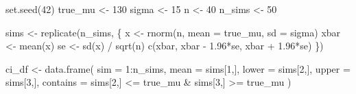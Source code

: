 \documentclass[
  12pt,
  letterpaper,
]{book}
\newenvironment{Shaded}{\begin{snugshade}}{\end{snugshade}}
\newcommand{\AttributeTok}[1]{\textcolor[rgb]{0.40,0.45,0.13}{#1}}
\newcommand{\DecValTok}[1]{\textcolor[rgb]{0.68,0.00,0.00}{#1}}
\newcommand{\FloatTok}[1]{\textcolor[rgb]{0.68,0.00,0.00}{#1}}
\newcommand{\FunctionTok}[1]{\textcolor[rgb]{0.28,0.35,0.67}{#1}}
\newcommand{\NormalTok}[1]{\textcolor[rgb]{0.00,0.23,0.31}{#1}}
\newcommand{\OtherTok}[1]{\textcolor[rgb]{0.00,0.23,0.31}{#1}}
\newcommand{\SpecialCharTok}[1]{\textcolor[rgb]{0.37,0.37,0.37}{#1}}
\begin{document}
\begin{Shaded}
\begin{Highlighting}[]
\FunctionTok{set.seed}\NormalTok{(}\DecValTok{42}\NormalTok{)}
\NormalTok{true\_mu }\OtherTok{\textless{}{-}} \DecValTok{130}
\NormalTok{sigma    }\OtherTok{\textless{}{-}} \DecValTok{15}
\NormalTok{n        }\OtherTok{\textless{}{-}} \DecValTok{40}
\NormalTok{n\_sims   }\OtherTok{\textless{}{-}} \DecValTok{50}

\NormalTok{sims }\OtherTok{\textless{}{-}} \FunctionTok{replicate}\NormalTok{(n\_sims, \{}
\NormalTok{  x    }\OtherTok{\textless{}{-}} \FunctionTok{rnorm}\NormalTok{(n, }\AttributeTok{mean =}\NormalTok{ true\_mu, }\AttributeTok{sd =}\NormalTok{ sigma)}
\NormalTok{  xbar }\OtherTok{\textless{}{-}} \FunctionTok{mean}\NormalTok{(x)}
\NormalTok{  se   }\OtherTok{\textless{}{-}} \FunctionTok{sd}\NormalTok{(x) }\SpecialCharTok{/} \FunctionTok{sqrt}\NormalTok{(n)}
  \FunctionTok{c}\NormalTok{(xbar, xbar }\SpecialCharTok{{-}} \FloatTok{1.96}\SpecialCharTok{*}\NormalTok{se, xbar }\SpecialCharTok{+} \FloatTok{1.96}\SpecialCharTok{*}\NormalTok{se)}
\NormalTok{\})}

\NormalTok{ci\_df }\OtherTok{\textless{}{-}} \FunctionTok{data.frame}\NormalTok{(}
  \AttributeTok{sim   =} \DecValTok{1}\SpecialCharTok{:}\NormalTok{n\_sims,}
  \AttributeTok{mean  =}\NormalTok{ sims[}\DecValTok{1}\NormalTok{,],}
  \AttributeTok{lower =}\NormalTok{ sims[}\DecValTok{2}\NormalTok{,],}
  \AttributeTok{upper =}\NormalTok{ sims[}\DecValTok{3}\NormalTok{,],}
  \AttributeTok{contains =}\NormalTok{ sims[}\DecValTok{2}\NormalTok{,] }\SpecialCharTok{\textless{}=}\NormalTok{ true\_mu }\SpecialCharTok{\&}\NormalTok{ sims[}\DecValTok{3}\NormalTok{,] }\SpecialCharTok{\textgreater{}=}\NormalTok{ true\_mu}
\NormalTok{)}


\end{Highlighting}
\end{Shaded}
\end{document}
